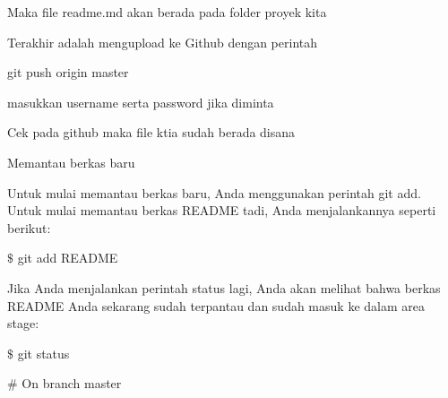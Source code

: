 \vspace{14pt}
\noindent 
{\fontsize{14pt}{14pt}\selectfont Maka file readme.md akan berada pada folder proyek kita \\} \par
\vspace{14pt}
\noindent 
{\fontsize{14pt}{14pt}\selectfont Terakhir adalah mengupload ke Github dengan perintah \\} \par
\vspace{14pt}
\noindent 
{\fontsize{14pt}{14pt}\selectfont git push origin master \\} \par
\vspace{14pt}
\noindent 
{\fontsize{14pt}{14pt}\selectfont masukkan username serta password jika diminta \\} \par
\noindent 
{\fontsize{14pt}{14pt}\selectfont Cek pada github maka file ktia sudah berada disana \\} \par
\vspace{14pt}
\noindent 
{\fontsize{14pt}{14pt}\selectfont Memantau berkas baru \\} \par
\vspace{14pt}
\noindent 
{\fontsize{14pt}{14pt}\selectfont Untuk mulai memantau berkas baru, Anda menggunakan perintah $  $git add. Untuk mulai memantau berkas README tadi, Anda menjalankannya seperti berikut: \\} \par
\vspace{14pt}
\noindent 
{\fontsize{14pt}{14pt}\selectfont  $  \$  $ git add README \\} \par
\vspace{14pt}
\noindent 
{\fontsize{14pt}{14pt}\selectfont Jika Anda menjalankan perintah $  $status $  $lagi, Anda akan melihat bahwa berkas README Anda sekarang sudah terpantau dan sudah masuk ke dalam area stage: \\} \par
\vspace{14pt}
\noindent 
{\fontsize{14pt}{14pt}\selectfont  $  \$  $ git status \\} \par
\noindent 
{\fontsize{14pt}{14pt}\selectfont  $  \#  $ On branch master \\} \par
\noindent 
